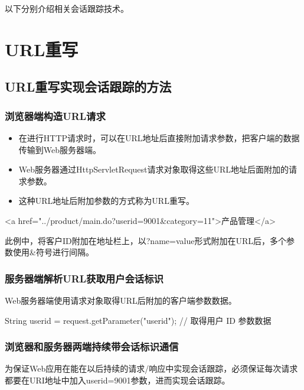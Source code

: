 以下分别介绍相关会话跟踪技术。

\section{URL重写}

\subsection{URL重写实现会话跟踪的方法}

\subsubsection{浏览器端构造URL请求}

\begin{itemize}
\item 在进行HTTP请求时，可以在URL地址后直接附加请求参数，把客户端的数据传输到Web服务器端。
\item Web服务器通过HttpServletRequest请求对象取得这些URL地址后面附加的请求参数。
\item 这种URL地址后附加参数的方式称为{\hei URL重写}。
\end{itemize}


\begin{xmlCode}
  <a href="../product/main.do?userid=9001&category=11">产品管理</a>
\end{xmlCode}

{\kai\Blue 此例中，将客户ID附加在地址栏上，以?name=value形式附加在URL后，多个参数使用\&符号进行间隔。}

\subsubsection{服务器端解析URL获取用户会话标识}
  
Web服务器端使用请求对象取得URL后附加的客户端参数数据。

\begin{javaCode}
  String userid = request.getParameter("userid"); // 取得用户 ID 参数数据
\end{javaCode}

\subsubsection{浏览器和服务器两端持续带会话标识通信}
  
为保证Web应用在能在以后持续的请求/响应中实现会话跟踪，必须保证每次请求
都要在URI地址中加入userid=9001参数，进而实现会话跟踪。

